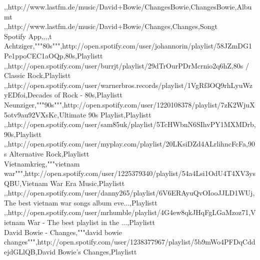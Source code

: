 ,,http://www.lastfm.de/music/David+Bowie/ChangesBowie,ChangesBowie,Albumt\\
,,http://www.lastfm.de/music/David+Bowie/Changes,Changes,Songt\\
Spotify App,,,,t\\
Achtziger,"""80s""",http://open.spotify.com/user/johannorin/playlist/58JZmDG1Pe1ppoCEC1aOQp,80s,Playlistt\\
,,http://open.spotify.com/user/burrjt/playlist/29dTrOurPDrMcrnio2q6hZ,80s / Classic Rock,Playlistt\\
,,http://open.spotify.com/user/warnerbros.records/playlist/1VgRf3OQ9rhLyuWzyEDfoi,Decades of Rock - 80s,Playlistt\\
Neunziger,"""90s""",http://open.spotify.com/user/1220108378/playlist/7zK2WjuX5otv9au92VXsKc,Ultimate 90s Playlist,Playlistt\\
,,http://open.spotify.com/user/sam85uk/playlist/5TcHWbnN6SIhvPY1MXMDrb,90s,Playlistt\\
,,http://open.spotify.com/user/myplay.com/playlist/20LKsiDZd4ALrlihncFcFa,90s Alternative Rock,Playlistt\\
Vietnamkrieg,"""vietnam war""",http://open.spotify.com/user/1225379340/playlist/54a4Lsi1OdU4T4XV3ysQBU,Vietnam War Era Music,Playlistt\\
,,http://open.spotify.com/user/danny265/playlist/6V6ERAyuQvOIooJJLD1WUj,The best vietnam war songs album eve...,Playlistt\\
,,http://open.spotify.com/user/mrhumble/playlist/4G4ew8qkJHqFgLGaMzoz71,Vietnam War - The best playlist in the ...,Playlistt\\
David Bowie - Changes,"""david bowie changes""",http://open.spotify.com/user/1238377967/playlist/5b9mWo4PFDqCddejdGLlQB,David Bowie's Changes,Playlistt\\

